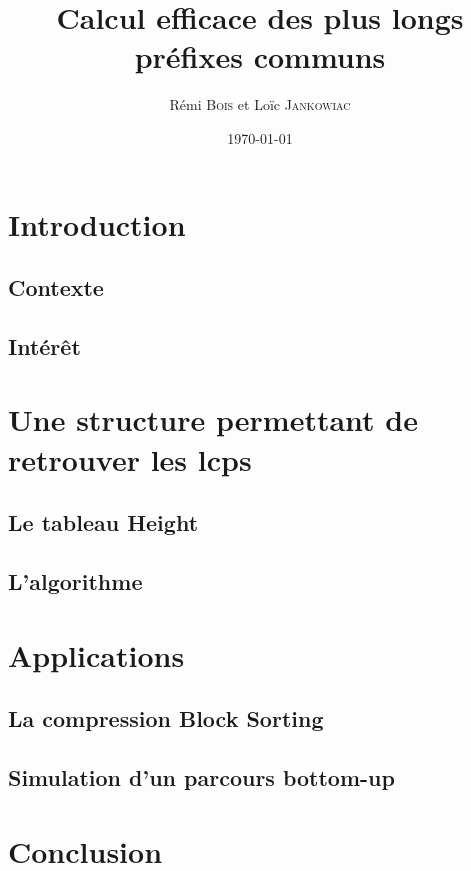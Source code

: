 \documentclass[a4paper,10pt]{article}
\title{Calcul efficace des plus longs préfixes communs}
\author{ Rémi \textsc{Bois} et Loïc \textsc{Jankowiac}}
\date{\today}
\begin{document}
\maketitle


\section{Introduction}
\label{sec:intro}


\subsection{Contexte}
\label{sec:context}

\subsection{Intérêt}
\label{sec:interest}



\section{Une structure permettant de retrouver les lcps}
\label{sec:heightstruct}


\subsection{Le tableau Height}
\label{sec:struct}



\subsection{L'algorithme}
\label{sec:algo}



\section{Applications}
\label{sec:appli}

\subsection{La compression Block Sorting}
\label{sec:blocksorting}

\subsection{Simulation d'un parcours bottom-up}
\label{sec:bottomup}

\section{Conclusion}
\label{sec:conclusion}
\end{document}

